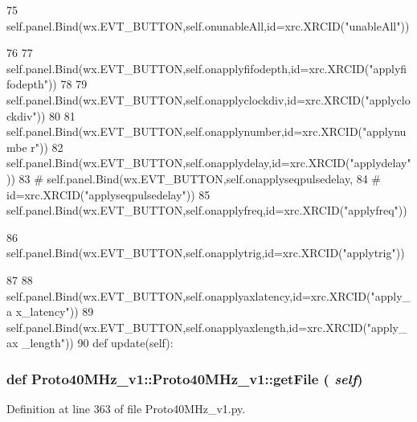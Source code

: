 \begin{DoxyCode}
75         self.panel.Bind(wx.EVT_BUTTON,self.onunableAll,id=xrc.XRCID("unableAll"))
      
76 
77         self.panel.Bind(wx.EVT_BUTTON,self.onapplyfifodepth,id=xrc.XRCID("applyfi
      fodepth"))
78 
79         self.panel.Bind(wx.EVT_BUTTON,self.onapplyclockdiv,id=xrc.XRCID("applyclo
      ckdiv"))
80 
81         self.panel.Bind(wx.EVT_BUTTON,self.onapplynumber,id=xrc.XRCID("applynumbe
      r"))
82         self.panel.Bind(wx.EVT_BUTTON,self.onapplydelay,id=xrc.XRCID("applydelay"
      ))
83 #        self.panel.Bind(wx.EVT_BUTTON,self.onapplyseqpulsedelay,
84 #                        id=xrc.XRCID("applyseqpulsedelay"))
85         self.panel.Bind(wx.EVT_BUTTON,self.onapplyfreq,id=xrc.XRCID("applyfreq"))
      
86         self.panel.Bind(wx.EVT_BUTTON,self.onapplytrig,id=xrc.XRCID("applytrig"))
      
87 
88         self.panel.Bind(wx.EVT_BUTTON,self.onapplyaxlatency,id=xrc.XRCID("apply_a
      x_latency"))
89         self.panel.Bind(wx.EVT_BUTTON,self.onapplyaxlength,id=xrc.XRCID("apply_ax
      _length"))
90 
    def update(self):
\end{DoxyCode}
\hypertarget{classProto40MHz__v1_1_1Proto40MHz__v1_a74fc1ae27fbec7692f3effdbf2c95a17}{
\subsubsection[{getFile}]{\setlength{\rightskip}{0pt plus 5cm}def Proto40MHz\_\-v1::Proto40MHz\_\-v1::getFile ( {\em self})}}
\label{classProto40MHz__v1_1_1Proto40MHz__v1_a74fc1ae27fbec7692f3effdbf2c95a17}


Definition at line 363 of file Proto40MHz\_\-v1.py.


